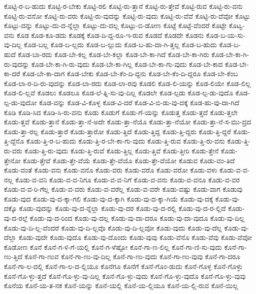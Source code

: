{ಕೊಟ್ಟಿ-ರ-ಬ-ಹುದು
ಕೊಟ್ಟಿ-ರ-ಬೇಕು
ಕೊಟ್ಟಿ-ರಲಿ
ಕೊಟ್ಟಿ-ರು-ತ್ತಾನೆ
ಕೊಟ್ಟಿ-ರು-ತ್ತೇವೆ
ಕೊಟ್ಟಿ-ರುವ
ಕೊಟ್ಟಿ-ರು-ವನು
ಕೊಟ್ಟಿ-ರು-ವನೋ
ಕೊಟ್ಟಿ-ರು-ವರು
ಕೊಟ್ಟಿ-ರು-ವುದನ್ನು
ಕೊಟ್ಟಿ-ರು-ವುದು
ಕೊಟ್ಟಿ-ರು-ವೆವೆ
ಕೊಟ್ಟಿ-ರು-ವೆವೋ
ಕೊಟ್ಟು
ಕೊಟ್ಟು-ದನ್ನು
ಕೊಟ್ಟು-ದು-ದ-ನ್ನೆಲ್ಲಾ
ಕೊಟ್ಟು-ದು-ದಲ್ಲ
ಕೊಟ್ಟು-ಬಿ-ಡೋಣ
ಕೊಟ್ಟೆ
ಕೊಟ್ಟೆ-ವೆಂದರೆ
ಕೊಟ್ಟೇ
ಕೊಟ್ವ-ವನು
ಕೊಡ
ಕೊಡ-ಕೂ-ಡದು
ಕೊಡಕ್ಕೆ
ಕೊಡ-ದಿ-ದ್ದ-ರೂ-ಇ-ರುವ
ಕೊಡದೆ
ಕೊಡದೇ
ಕೊಡನು
ಕೊಡ-ಬ-ಯ-ಸು-ವು-ದಿಲ್ಲ
ಕೊಡ-ಬಲ್ಲ
ಕೊಡ-ಬ-ಲ್ಲದು
ಕೊಡ-ಬ-ಲ್ಲುದು
ಕೊಡ-ಬ-ಹು-ದಾ-ಗಿ-ತ್ತಲ್ಲ
ಕೊಡ-ಬ-ಹುದು
ಕೊಡ-ಬ-ಹುದೆ
ಕೊಡ-ಬಾ-ರದು
ಕೊಡ-ಬೇ-ಕಲ್ಲ
ಕೊಡ-ಬೇ-ಕಲ್ಲಾ
ಕೊಡ-ಬೇ-ಕಾ-ಗಿದೆ
ಕೊಡ-ಬೇ-ಕಾ-ಗಿರು
ಕೊಡ-ಬೇ-ಕಾ-ಗಿ-ರು-ವುದನ್ನು
ಕೊಡ-ಬೇ-ಕಾ-ಗಿ-ರು-ವುದು
ಕೊಡ-ಬೇ-ಕಾ-ಗಿಲ್ಲ
ಕೊಡ-ಬೇ-ಕಾ-ಗು-ವುದು
ಕೊಡ-ಬೇ-ಕಾದ
ಕೊಡ-ಬೇ-ಕಾ-ದರೆ
ಕೊಡ-ಬೇ-ಕಾ-ದಾಗ
ಕೊಡ-ಬೇಕು
ಕೊಡ-ಬೇ-ಕೆಂ-ದಿ-ದ್ದನು
ಕೊಡ-ಬೇ-ಕೆಂ-ದಿ-ದ್ದರೂ
ಕೊಡ-ಬೇ-ಕೆಂಬ
ಕೊಡ-ಲಾ-ರ-ದಿ-ರು-ವುದನ್ನು
ಕೊಡ-ಲಾ-ರದು
ಕೊಡ-ಲಾ-ರವು
ಕೊಡಲಿ
ಕೊಡ-ಲಿ-ಯನ್ನು
ಕೊಡ-ಲಿಯೇ
ಕೊಡ-ಲಿಲ್ಲ
ಕೊಡ-ಲಿ-ಲ್ಲವೆ
ಕೊಡಲು
ಕೊಡಲೂ
ಕೊಡ-ಲೆ-ತ್ನಿ-ಸು-ವು-ದಿಲ್ಲ
ಕೊಡಲೇ
ಕೊಡ-ಲ್ಪಡು
ಕೊಡ-ಲ್ಪ-ಡು-ವುದೊ
ಕೊಡ-ಲ್ಪ-ಡು-ವುದೋ
ಕೊಡ-ವನ್ನು
ಕೊಡ-ವಿ-ಕೊಳ್ಳ
ಕೊಡ-ವಿ-ದರೆ
ಕೊಡ-ವಿ-ಬಿ-ಡು-ವು-ದಕ್ಕೆ
ಕೊಡ-ಹು-ವು-ದಾ-ಗಿದೆ
ಕೊಡಿ
ಕೊಡಿ-ಸಿದ
ಕೊಡಿ-ಸಿ-ರು-ವನು
ಕೊಡು
ಕೊಡುಗೆ
ಕೊಡು-ಗೆ-ಯನ್ನು
ಕೊಡುತ್ತ
ಕೊಡು-ತ್ತದೆ
ಕೊಡು-ತ್ತಲೇ
ಕೊಡು-ತ್ತವೆ
ಕೊಡು-ತ್ತಾನೆ
ಕೊಡು-ತ್ತಾ-ನೆ-ಅದೇ
ಕೊಡು-ತ್ತಾ-ನೆಯೊ
ಕೊಡು-ತ್ತಾ-ನೆಯೋ
ಕೊಡು-ತ್ತಾ-ನೆ-ಸ-ಮು-ದ್ರದ
ಕೊಡು-ತ್ತಾ-ರಲ್ಲ
ಕೊಡು-ತ್ತಾರೆ
ಕೊಡು-ತ್ತಾರೋ
ಕೊಡು-ತ್ತಿದೆ
ಕೊಡು-ತ್ತಿದ್ದ
ಕೊಡು-ತ್ತಿ-ದ್ದರು
ಕೊಡು-ತ್ತಿ-ದ್ದರೆ
ಕೊಡು-ತ್ತಿ-ದ್ದೆನೊ
ಕೊಡು-ತ್ತಿ-ರ-ಬ-ಹುದು
ಕೊಡು-ತ್ತಿ-ರ-ಬೇ-ಕಾ-ಗು-ವುದು
ಕೊಡು-ತ್ತಿ-ರುವ
ಕೊಡು-ತ್ತಿ-ರು-ವನು
ಕೊಡು-ತ್ತಿ-ರು-ವರು
ಕೊಡು-ತ್ತಿ-ರು-ವುದು
ಕೊಡು-ತ್ತಿ-ರುವೆ
ಕೊಡು-ತ್ತಿಲ್ಲ
ಕೊಡು-ತ್ತಿವೆ
ಕೊಡು-ತ್ತೀರಿ
ಕೊಡು-ತ್ತೇನೆ
ಕೊಡು-ತ್ತೇನೋ
ಕೊಡು-ತ್ತೇವೆ
ಕೊಡು-ತ್ತೇ-ವೆಯೆ
ಕೊಡು-ತ್ತೇ-ವೆಯೊ
ಕೊಡು-ತ್ತೇ-ವೆಯೋ
ಕೊಡುವ
ಕೊಡು-ವಂ-ತಿದೆ
ಕೊಡು-ವಂತೆ
ಕೊಡು-ವನು
ಕೊಡು-ವನೊ
ಕೊಡು-ವರು
ಕೊಡು-ವರೊ
ಕೊಡು-ವರೋ
ಕೊಡು-ವಳು
ಕೊಡು-ವ-ವ-ನಲ್ಲ
ಕೊಡು-ವ-ವನಿ
ಕೊಡು-ವ-ವ-ನಿಗೂ
ಕೊಡು-ವ-ವ-ನಿಗೆ
ಕೊಡು-ವ-ವನು
ಕೊಡು-ವ-ವನೂ
ಕೊಡು-ವ-ವರ
ಕೊಡು-ವ-ವ-ರಿ-ಗೆಲ್ಲ
ಕೊಡು-ವ-ವರು
ಕೊಡು-ವ-ವರೆಲ್ಲ
ಕೊಡು-ವ-ವರೇ
ಕೊಡು-ವಷ್ಟು
ಕೊಡು-ವಾಗ
ಕೊಡುವು
ಕೊಡು-ವುದ
ಕೊಡು-ವು-ದ-ಕ್ಕಾ-ಗಲಿ
ಕೊಡು-ವು-ದ-ಕ್ಕಾಗಿ
ಕೊಡು-ವು-ದ-ಕ್ಕಾ-ಗಿಯೆ
ಕೊಡು-ವು-ದಕ್ಕೆ
ಕೊಡು-ವು-ದಕ್ಕೊ
ಕೊಡು-ವುದನ್ನು
ಕೊಡು-ವು-ದ-ನ್ನೆಲ್ಲಾ
ಕೊಡು-ವು-ದರ
ಕೊಡು-ವು-ದ-ರಲ್ಲಿ
ಕೊಡು-ವು-ದ-ರ-ಲ್ಲಿದೆ
ಕೊಡು-ವು-ದ-ರಲ್ಲೆ
ಕೊಡು-ವು-ದ-ರಿಂದ
ಕೊಡು-ವು-ದಲ್ಲ
ಕೊಡು-ವು-ದಾ-ದರೂ
ಕೊಡು-ವು-ದಾ-ವುದೂ
ಕೊಡು-ವು-ದಿಲ್ಲ
ಕೊಡು-ವು-ದಿ-ಲ್ಲ-ವೆಂದರೆ
ಕೊಡು-ವು-ದಿ-ಲ್ಲವೊ
ಕೊಡು-ವು-ದಿ-ಲ್ಲವೋ
ಕೊಡು-ವುದು
ಕೊಡು-ವು-ದೆಲ್ಲ
ಕೊಡು-ವು-ದೆಲ್ಲಾ
ಕೊಡು-ವುದೇ
ಕೊಡು-ವುದೊ
ಕೊಡು-ವು-ದೊಂದು
ಕೊಡು-ವುವು
ಕೊಡು-ವೆನೊ
ಕೊಡು-ವೆವು
ಕೊಡು-ವೆವೋ
ಕೊಡೋಣ
ಕೊನೆ
ಕೊನೆ-ಗ-ಳಿ-ಗೆ-ಯಲ್ಲಿ
ಕೊನೆ-ಗ-ಳೆಷ್ಟೋ
ಕೊನೆ-ಗಾ-ಣ-ಲಿಲ್ಲ
ಕೊನೆ-ಗಾ-ಣಿ-ಸು-ವುದು
ಕೊನೆ-ಗಾ-ಣು-ತ್ತಿದೆ
ಕೊನೆ-ಗಾ-ಣುವ
ಕೊನೆ-ಗಾ-ಣು-ವು-ದಿಲ್ಲ
ಕೊನೆ-ಗಾ-ಣು-ವುದು
ಕೊನೆ-ಗಾ-ಣು-ವುವು
ಕೊನೆ-ಗಾ-ದರೂ
ಕೊನೆ-ಗಾ-ಲ-ದಲ್ಲಿ
ಕೊನೆ-ಗಾ-ಲ-ದ-ಲ್ಲಿಯೂ
ಕೊನೆಗೂ
ಕೊನೆಗೆ
ಕೊನೆ-ಗೊಂ-ಡುದು
ಕೊನೆ-ಗೊಳ್ಳ
ಕೊನೆ-ಗೊಳ್ಳು
ಕೊನೆ-ಗೊ-ಳ್ಳು-ತ್ತದೆ
ಕೊನೆ-ಗೊ-ಳ್ಳು-ವು-ದಿಲ್ಲ
ಕೊನೆ-ಗೊ-ಳ್ಳು-ವುದು
ಕೊನೆ-ಗೊ-ಳ್ಳು-ವುದೊ
ಕೊನೆ-ಗೊ-ಳ್ಳು-ವುವು
ಕೊನೆಯ
ಕೊನೆ-ಯ-ತ-ನಕ
ಕೊನೆ-ಯನ್ನು
ಕೊನೆ-ಯಲ್ಲಿ
ಕೊನೆ-ಯ-ಲ್ಲಿಯೂ
ಕೊನೆ-ಯ-ಲ್ಲಿ-ರುವ
ಕೊನೆ-ಯಿಲ್ಲ
}
